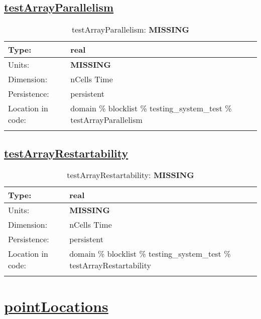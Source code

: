 \subsection[testArrayParallelism]{\hyperref[sec:var_tab_testing_system_test]{testArrayParallelism}}
\label{subsec:var_sec_testing_system_test_testArrayParallelism}
\begin{center}
\begin{longtable}{| p{2.0in} | p{4.0in} |}
        \hline 
        Type: & real \\
        \hline 
        Units: & {\bf \color{red} MISSING} \\
        \hline 
        Dimension: & nCells Time \\
        \hline 
        Persistence: & persistent \\
        \hline 
         Location in code: & domain \% blocklist \% testing\_system\_test \% testArrayParallelism \\
         \hline 
    \caption{testArrayParallelism: {\bf \color{red} MISSING}}
\end{longtable}
\end{center}
\subsection[testArrayRestartability]{\hyperref[sec:var_tab_testing_system_test]{testArrayRestartability}}
\label{subsec:var_sec_testing_system_test_testArrayRestartability}
\begin{center}
\begin{longtable}{| p{2.0in} | p{4.0in} |}
        \hline 
        Type: & real \\
        \hline 
        Units: & {\bf \color{red} MISSING} \\
        \hline 
        Dimension: & nCells Time \\
        \hline 
        Persistence: & persistent \\
        \hline 
         Location in code: & domain \% blocklist \% testing\_system\_test \% testArrayRestartability \\
         \hline 
    \caption{testArrayRestartability: {\bf \color{red} MISSING}}
\end{longtable}
\end{center}
\section[pointLocations]{\hyperref[sec:var_tab_pointLocations]{pointLocations}}
\label{sec:var_sec_pointLocations}
